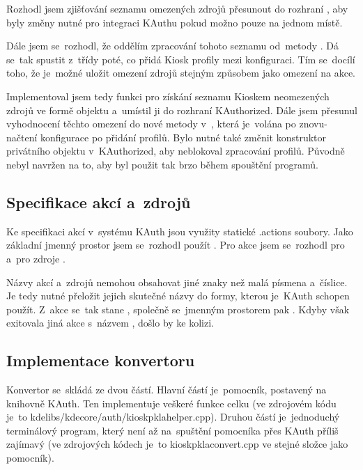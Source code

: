 Rozhodl jsem zjišťování seznamu omezených zdrojů přesunout do rozhraní , aby byly změny nutné pro integraci KAuthu pokud možno pouze na jednom místě.

Dále jsem se~rozhodl, že oddělím zpracování tohoto seznamu od~metody . Dá se~tak spustit z~třídy  poté, co  přidá Kiosk profily mezi konfiguraci. Tím se~docílí toho, že je~možné uložit omezení zdrojů stejným způsobem jako omezení na akce.

Implementoval jsem tedy funkci  pro získání seznamu Kioskem neomezených zdrojů ve formě objektu  a~umístil ji do rozhraní KAuthorized. Dále jsem přesunul vyhodnocení těchto omezení do nové metody \linebreak{} v~, která je~volána po znovu-načtení konfigurace po přidání profilů. Bylo nutné také změnit konstruktor privátního objektu v~KAuthorized, aby neblokoval zpracování profilů. Původně nebyl navržen na to, aby byl použit tak brzo během spouštění programů.

\subsection*{Specifikace akcí a~zdrojů}
Ke specifikaci akcí v~systému KAuth jsou využity statické .actions soubory. Jako základní jmenný prostor jsem se~rozhodl použít . Pro akce jsem se~rozhodl pro  a~pro zdroje .

Názvy akcí a~zdrojů nemohou obsahovat jiné znaky než malá písmena a~číslice. Je tedy nutné přeložit jejich skutečné názvy do formy, kterou je~KAuth schopen použít. Z~akce  se~tak stane , společně se~jmenným prostorem pak \linebreak{}. Kdyby však exitovala jiná akce s~názvem , došlo by ke kolizi.

\subsection*{Implementace konvertoru}
Konvertor se~skládá ze dvou částí. Hlavní částí je~pomocník, postavený na knihovně KAuth. Ten implementuje veškeré funkce celku (ve zdrojovém kódu je~to kdelibs/kdecore/auth/kioskpklahelper.cpp). Druhou částí je~jednoduchý terminálový program, který není až na~spuštění pomocníka přes KAuth příliš zajímavý (ve zdrojových kódech je~to kioskpklaconvert.cpp ve stejné složce jako pomocník).


